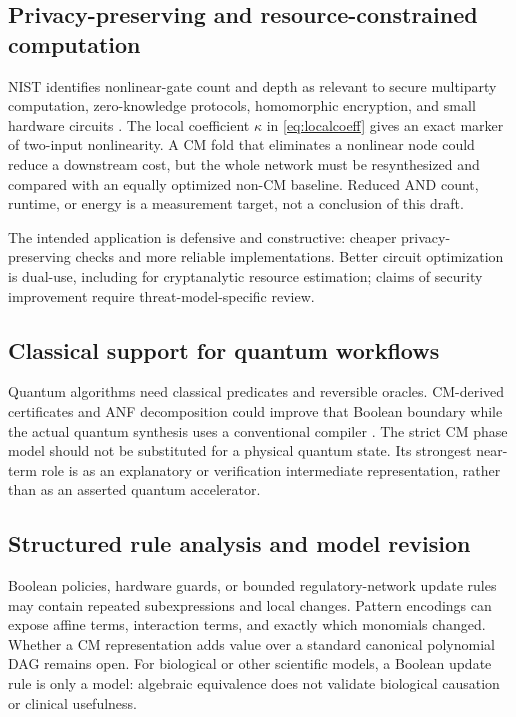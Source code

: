 \documentclass[11pt,a4paper]{article}
\theoremstyle{definition}\newtheorem{definition}[theorem]{Definition}
\theoremstyle{remark}\newtheorem{remark}[theorem]{Remark}
\numberwithin{equation}{section}
\begin{document}
\subsection{Privacy-preserving and resource-constrained computation}
NIST identifies nonlinear-gate count and depth as relevant to secure multiparty computation, zero-knowledge protocols, homomorphic encryption, and small hardware circuits \cite{nist}. The local coefficient $\kappa$ in \cref{eq:localcoeff} gives an exact marker of two-input nonlinearity. A CM fold that eliminates a nonlinear node could reduce a downstream cost, but the whole network must be resynthesized and compared with an equally optimized non-CM baseline. Reduced AND count, runtime, or energy is a measurement target, not a conclusion of this draft.

The intended application is defensive and constructive: cheaper privacy-preserving checks and more reliable implementations. Better circuit optimization is dual-use, including for cryptanalytic resource estimation; claims of security improvement require threat-model-specific review.

\subsection{Classical support for quantum workflows}
Quantum algorithms need classical predicates and reversible oracles. CM-derived certificates and ANF decomposition could improve that Boolean boundary while the actual quantum synthesis uses a conventional compiler \cite{xag}. The strict CM phase model should not be substituted for a physical quantum state. Its strongest near-term role is as an explanatory or verification intermediate representation, rather than as an asserted quantum accelerator.

\subsection{Structured rule analysis and model revision}
Boolean policies, hardware guards, or bounded regulatory-network update rules may contain repeated subexpressions and local changes. Pattern encodings can expose affine terms, interaction terms, and exactly which monomials changed. Whether a CM representation adds value over a standard canonical polynomial DAG remains open. For biological or other scientific models, a Boolean update rule is only a model: algebraic equivalence does not validate biological causation or clinical usefulness.
\end{document}
